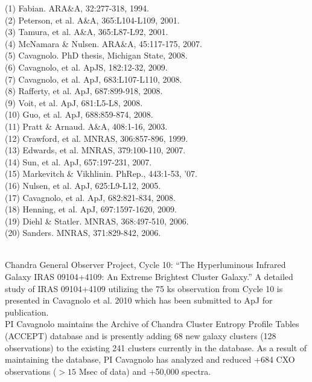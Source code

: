 \documentclass[letterpaper,11pt,twocolumn]{article}
\begin{document}
\small
%
\noindent(1) Fabian. ARA\&A, 32:277-318, 1994.\\
(2) Peterson, et al. A\&A, 365:L104-L109, 2001.\\
(3) Tamura, et al. A\&A, 365:L87-L92, 2001.\\
(4) McNamara \& Nulsen. ARA\&A, 45:117-175, 2007.\\
(5) Cavagnolo. PhD thesis, Michigan State, 2008.\\
(6) Cavagnolo, et al. ApJS, 182:12-32, 2009.\\
(7) Cavagnolo, et al. ApJ, 683:L107-L110, 2008.\\
(8) Rafferty, et al. ApJ, 687:899-918, 2008.\\
(9) Voit, et al. ApJ, 681:L5-L8, 2008.\\
(10) Guo, et al. ApJ, 688:859-874, 2008.\\
(11) Pratt \& Arnaud. A\&A, 408:1-16, 2003.\\
(12) Crawford, et al. MNRAS, 306:857-896, 1999.\\
(13) Edwards, et al. MNRAS, 379:100-110, 2007.\\
(14) Sun, et al. ApJ, 657:197-231, 2007.\\
(15) Markevitch \& Vikhlinin. PhRep., 443:1-53, '07.\\
(16) Nulsen, et al. ApJ, 625:L9-L12, 2005.\\
(17) Cavagnolo, et al. ApJ, 682:821-834, 2008.\\
(18) Henning, et al. ApJ, 697:1597-1620, 2009.\\
(19) Diehl \& Statler. MNRAS, 368:497-510, 2006.\\
(20) Sanders. MNRAS, 371:829-842, 2006.

\onecolumn
\normalsize
{}\\

Chandra General Observer Project, Cycle 10: ``The Hyperluminous
Infrared Galaxy IRAS 09104+4109: An Extreme Brightest Cluster
Galaxy.'' A detailed study of IRAS 09104+4109 utilizing the 75 ks
observation from Cycle 10 is presented in Cavagnolo et al. 2010 which
has been submitted to ApJ for publication.\\

PI Cavagnolo maintains the Archive of Chandra Cluster Entropy Profile
Tables (ACCEPT) database and is presently adding 68 new galaxy
clusters (128 observations) to the existing 241 clusters currently in
the database. As a result of maintaining the database, PI Cavagnolo
has analyzed and reduced +684 CXO observations ($> 15$ Msec of data)
and +50,000 spectra.
\end{document}

